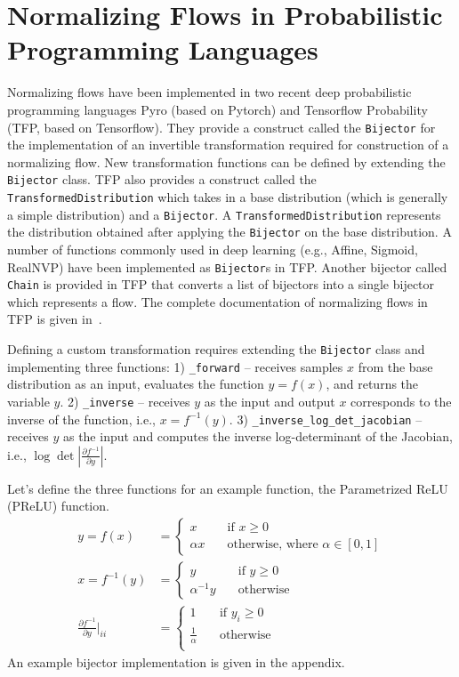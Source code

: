 \documentclass[runningheads]{llncs}
\begin{document}
\section{Normalizing Flows in Probabilistic Programming Languages}
Normalizing flows have been implemented in two recent deep probabilistic programming languages Pyro (based on Pytorch) and Tensorflow Probability (TFP, based on Tensorflow). They provide a construct called the \texttt{Bijector} for the implementation of an invertible transformation required for construction of a normalizing flow. New transformation functions can be defined by extending the \texttt{Bijector} class. TFP also provides a construct called the \texttt{TransformedDistribution} which takes in a base distribution (which is generally a simple distribution) and a \texttt{Bijector}. A \texttt{TransformedDistribution} represents the distribution obtained after applying the \texttt{Bijector} on the base distribution. A number of functions commonly used in deep learning (e.g., Affine, Sigmoid, RealNVP) have been implemented as \texttt{Bijector}s in TFP. Another bijector called \texttt{Chain} is provided in TFP that converts a list of bijectors into a single bijector which represents a flow. The complete documentation of normalizing flows in TFP is given in~\cite{dillon2017tensorflow}.

Defining a custom transformation requires extending the \texttt{Bijector} class and implementing three functions: 1) \texttt{\_forward} -- receives samples $x$ from the base distribution as an input, evaluates the function $y = f(x)$, and returns the variable $y$. 2) \texttt{\_inverse} -- receives $y$ as the input and output $x$ corresponds to the inverse of the function, i.e., $x = f^{-1}(y)$. 3) \texttt{\_inverse\_log\_det\_jacobian} -- receives $y$ as the input and computes the inverse log-determinant of the Jacobian, i.e., $\log \det \left|\frac{\partial f^{-1}}{\partial y}\right|$. 

Let's define the three functions for an example function, the Parametrized ReLU (PReLU) function.
\begin{align}
y = f(x) &= \begin{cases}
x\quad&\text{if } x \geq 0\\
\alpha x\quad&\text{otherwise, where }\alpha\in [0, 1]
\end{cases}\\
x = f^{-1}(y) &= \begin{cases}
y\quad&\text{if } y \geq 0\\
\alpha^{-1} y\quad&\text{otherwise}
\end{cases}\\
\frac{\partial f^{-1}}{\partial y}\Bigg|_{ii} &= 
\begin{cases}
1\quad&\text{if } y_i \geq 0\\
\frac{1}{\alpha}\quad&\text{otherwise}\\
\end{cases}
\end{align}
An example bijector implementation is given in the appendix.
\end{document}
